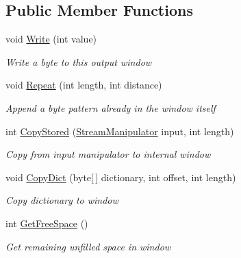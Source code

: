 \subsection*{Public Member Functions}
\begin{DoxyCompactItemize}
\item 
void \hyperlink{class_i_c_sharp_code_1_1_sharp_zip_lib_1_1_zip_1_1_compression_1_1_streams_1_1_output_window_a907667959a906512f4e133765f58f5f6}{Write} (int value)
\begin{DoxyCompactList}\small\item\em Write a byte to this output window \end{DoxyCompactList}\item 
void \hyperlink{class_i_c_sharp_code_1_1_sharp_zip_lib_1_1_zip_1_1_compression_1_1_streams_1_1_output_window_a178618bcf366724847f54fd89d354387}{Repeat} (int length, int distance)
\begin{DoxyCompactList}\small\item\em Append a byte pattern already in the window itself \end{DoxyCompactList}\item 
int \hyperlink{class_i_c_sharp_code_1_1_sharp_zip_lib_1_1_zip_1_1_compression_1_1_streams_1_1_output_window_a2d2ae06a42c52d98946f46db44d565f0}{Copy\+Stored} (\hyperlink{class_i_c_sharp_code_1_1_sharp_zip_lib_1_1_zip_1_1_compression_1_1_streams_1_1_stream_manipulator}{Stream\+Manipulator} input, int length)
\begin{DoxyCompactList}\small\item\em Copy from input manipulator to internal window \end{DoxyCompactList}\item 
void \hyperlink{class_i_c_sharp_code_1_1_sharp_zip_lib_1_1_zip_1_1_compression_1_1_streams_1_1_output_window_a2d169e228a99a67262fa9c6ce549e251}{Copy\+Dict} (byte\mbox{[}$\,$\mbox{]} dictionary, int offset, int length)
\begin{DoxyCompactList}\small\item\em Copy dictionary to window \end{DoxyCompactList}\item 
int \hyperlink{class_i_c_sharp_code_1_1_sharp_zip_lib_1_1_zip_1_1_compression_1_1_streams_1_1_output_window_af9e1b4ad75dfa1aa878fc6daa8a3d5e3}{Get\+Free\+Space} ()
\begin{DoxyCompactList}\small\item\em Get remaining unfilled space in window \end{DoxyCompactList}\item 

\end{DoxyCompactItemize}
